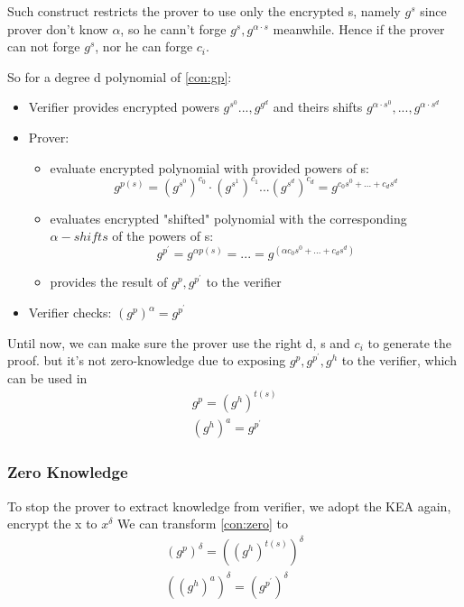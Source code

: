 \documentclass[a4paper,11pt]{article}
\begin{document}
Such construct restricts the prover to use only the encrypted s, namely $g^s$ since prover don't know $\alpha$, so he cann't forge $g^s, g^{\alpha \cdot s}$ meanwhile.  Hence if the prover can not forge $g^s$, nor he can forge $c_i$.

So for a degree d polynomial of \ref{con:gp}:
\begin{itemize}
\item Verifier provides encrypted powers $g^{s^0}..., g^{g^d}$ and theirs shifts $g^{\alpha \cdot s^0}, ..., g^{\alpha \cdot s^d}$

\item Prover: 
\begin{itemize}
\item evaluate encrypted polynomial with provided powers of s: 
\begin{equation}
g^{p(s)} = (g^{s^0})^{c_0} \cdot (g^{s^1})^{c_1} ... (g^{s^d})^{c_d} = g^{c_0s^0 + ... + c_ds^d}
\end{equation}
\item evaluates encrypted "shifted" polynomial with the corresponding $\alpha-shifts$ of the powers of s:
\begin{equation}
g^{p^{'}} = g^{\alpha p(s)} = ... =  g^{(\alpha{c_0s^0 + ... + c_ds^d})}
\end{equation}
\item provides the result of $g^p, g^{p^{'}}$ to the verifier
\end{itemize}

\item Verifier checks: $(g^p)^{\alpha} = g^{p^{'}} $
\end{itemize}

Until now, we can make sure the prover use the right d, s and $c_i$ to generate the proof. but it's not zero-knowledge due to exposing  $g^p, g^{p^{'}}, g^h$ to the verifier, which can be used in 
\begin{equation}  
\begin{split}
g^p = (g^h)^{t(s)}   \label{con:zero} \\
(g^h)^a = g^{p^{'}}
\end{split}
\end{equation} 

\subsubsection{Zero Knowledge}

To stop the prover to extract knowledge from verifier,  we adopt the KEA again, encrypt the x to $x^{\delta}$
We can transform \ref{con:zero} to 
\begin{displaymath}
\begin{split}
(g^p)^{\delta} = ((g^h)^{t(s)})^{\delta}    \\
((g^h)^a)^{\delta}  = (g^{p^{'}})^{\delta} 
\end{split}
\end{displaymath}
\end{document}
